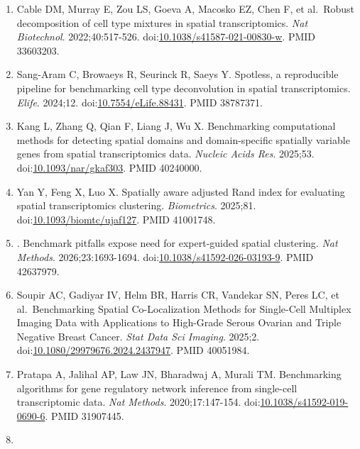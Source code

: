 \documentclass{article}
\begin{document}
\begin{enumerate}
  al.~Cell2location maps fine-grained cell types in spatial
  transcriptomics. \emph{Nat Biotechnol}. 2022;40:661-671.
  doi:\href{https://doi.org/10.1038/s41587-021-01139-4}{10.1038/s41587-021-01139-4}.
  PMID 35027729.
\item
  Cable DM, Murray E, Zou LS, Goeva A, Macosko EZ, Chen F, et al.~Robust
  decomposition of cell type mixtures in spatial transcriptomics.
  \emph{Nat Biotechnol}. 2022;40:517-526.
  doi:\href{https://doi.org/10.1038/s41587-021-00830-w}{10.1038/s41587-021-00830-w}.
  PMID 33603203.
\item
  Sang-Aram C, Browaeys R, Seurinck R, Saeys Y. Spotless, a reproducible
  pipeline for benchmarking cell type deconvolution in spatial
  transcriptomics. \emph{Elife}. 2024;12.
  doi:\href{https://doi.org/10.7554/eLife.88431}{10.7554/eLife.88431}.
  PMID 38787371.
\item
  Kang L, Zhang Q, Qian F, Liang J, Wu X. Benchmarking computational
  methods for detecting spatial domains and domain-specific spatially
  variable genes from spatial transcriptomics data. \emph{Nucleic Acids
  Res}. 2025;53.
  doi:\href{https://doi.org/10.1093/nar/gkaf303}{10.1093/nar/gkaf303}.
  PMID 40240000.
\item
  Yan Y, Feng X, Luo X. Spatially aware adjusted Rand index for
  evaluating spatial transcriptomics clustering. \emph{Biometrics}.
  2025;81.
  doi:\href{https://doi.org/10.1093/biomtc/ujaf127}{10.1093/biomtc/ujaf127}.
  PMID 41001748.
\item
  . Benchmark pitfalls expose need for expert-guided spatial clustering.
  \emph{Nat Methods}. 2026;23:1693-1694.
  doi:\href{https://doi.org/10.1038/s41592-026-03193-9}{10.1038/s41592-026-03193-9}.
  PMID 42637979.
\item
  Soupir AC, Gadiyar IV, Helm BR, Harris CR, Vandekar SN, Peres LC, et
  al.~Benchmarking Spatial Co-Localization Methods for Single-Cell
  Multiplex Imaging Data with Applications to High-Grade Serous Ovarian
  and Triple Negative Breast Cancer. \emph{Stat Data Sci Imaging}.
  2025;2.
  doi:\href{https://doi.org/10.1080/29979676.2024.2437947}{10.1080/29979676.2024.2437947}.
  PMID 40051984.
\item
  Pratapa A, Jalihal AP, Law JN, Bharadwaj A, Murali TM. Benchmarking
  algorithms for gene regulatory network inference from single-cell
  transcriptomic data. \emph{Nat Methods}. 2020;17:147-154.
  doi:\href{https://doi.org/10.1038/s41592-019-0690-6}{10.1038/s41592-019-0690-6}.
  PMID 31907445.
\item

\end{enumerate}
\end{document}
